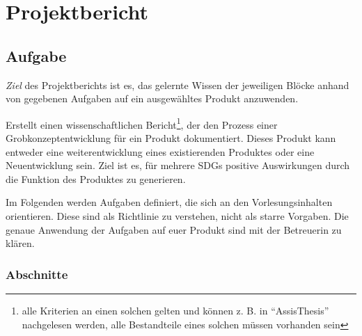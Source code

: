 \documentclass[DIV=15,headinclude=true]{scrreprt}
\begin{document}
{\begin{landscape}
\begin{table}[]
{\begin{tabulary}{\linewidth}{JJJJJ}
				\end{tabulary}
			}
		\end{table}
	\end{landscape}
}

\chapter{Projektbericht}
\label{projektbericht}

\section{Aufgabe}

\emph{Ziel} des Projektberichts ist es, das gelernte Wissen der
jeweiligen Blöcke anhand von gegebenen Aufgaben auf ein ausgewähltes
Produkt anzuwenden.


Erstellt einen wissenschaftlichen Bericht\footnote{alle Kriterien an einen
	solchen gelten und können z. B. in "`AssisThesis"' \cite{Theuerkauf2009} nachgelesen werden, alle
	Bestandteile eines solchen müssen vorhanden sein}, der den Prozess einer
Grobkonzeptentwicklung für ein Produkt dokumentiert. Dieses Produkt kann
entweder eine weiterentwicklung eines existierenden Produktes oder eine
Neuentwicklung sein. Ziel ist es, für mehrere SDGs positive Auswirkungen
durch die Funktion des Produktes zu generieren.

Im Folgenden werden Aufgaben definiert, die sich an den
Vorlesungsinhalten orientieren. Diese sind als Richtlinie zu verstehen,
nicht als starre Vorgaben. Die genaue Anwendung der Aufgaben auf euer
Produkt sind mit der Betreuerin zu klären.

\subsection{Abschnitte}
\end{document}
